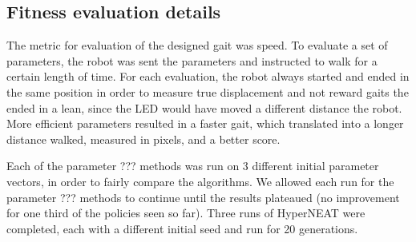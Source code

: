 \subsection{Fitness evaluation details}



The metric for evaluation of the designed gait was speed. To evaluate
a set of parameters, the robot was sent the parameters and instructed
to walk for a certain length of time. For each evaluation, the robot
always started and ended in the same position in order to measure true
displacement and not reward gaits the ended in a lean, since the LED
would have moved a different distance the robot. More efficient
parameters resulted in a faster gait, which translated into a longer
distance walked, measured in pixels, and a better score.

Each of the parameter ??? methods was run on 3 different initial
parameter vectors, in order to fairly compare the algorithms. We allowed 
each run for the parameter ??? methods to
continue until the results plateaued (no improvement for one third of
the policies seen so far). Three runs of HyperNEAT were completed,
each with a different initial seed and run for 20 generations.
